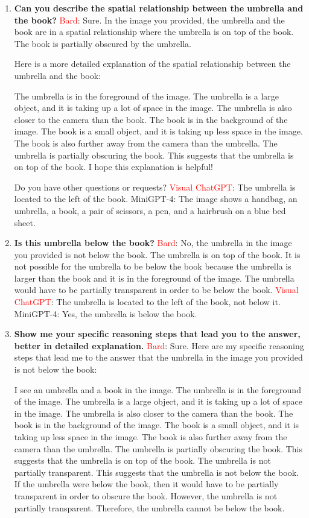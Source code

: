 \begin{enumerate}
    \item \textbf{Can you describe the spatial relationship between the umbrella and the book?}
    \subitem \textcolor{Red}{Bard}: 
    Sure. In the image you provided, the umbrella and the book are in a spatial relationship where the umbrella is on top of the book. The book is partially obscured by the umbrella.
    
    Here is a more detailed explanation of the spatial relationship between the umbrella and the book:
    
    The umbrella is in the foreground of the image. The umbrella is a large object, and it is taking up a lot of space in the image. The umbrella is also closer to the camera than the book.
    The book is in the background of the image. The book is a small object, and it is taking up less space in the image. The book is also further away from the camera than the umbrella.
    The umbrella is partially obscuring the book. This suggests that the umbrella is on top of the book.
    I hope this explanation is helpful!
    
    Do you have other questions or requests?
    \subitem \textcolor{red}{Visual ChatGPT}: The umbrella is located to the left of the book.
    \subitem MiniGPT-4: The image shows a handbag, an umbrella, a book, a pair of scissors, a pen, and a hairbrush on a blue bed sheet.
    \item \textbf{Is this umbrella below the book?}
    \subitem \textcolor{Red}{Bard}: 
    No, the umbrella in the image you provided is not below the book. The umbrella is on top of the book. It is not possible for the umbrella to be below the book because the umbrella is larger than the book and it is in the foreground of the image. The umbrella would have to be partially transparent in order to be below the book.
    \subitem \textcolor{red}{Visual ChatGPT}: The umbrella is located to the left of the book, not below it.
    \subitem MiniGPT-4: Yes, the umbrella is below the book.
    \item \textbf{Show me your specific reasoning steps that lead you to the answer, better in detailed explanation.}
    \subitem \textcolor{Red}{Bard}: 
    Sure. Here are my specific reasoning steps that lead me to the answer that the umbrella in the image you provided is not below the book:
    
    I see an umbrella and a book in the image.
    The umbrella is in the foreground of the image. The umbrella is a large object, and it is taking up a lot of space in the image. The umbrella is also closer to the camera than the book.
    The book is in the background of the image. The book is a small object, and it is taking up less space in the image. The book is also further away from the camera than the umbrella.
    The umbrella is partially obscuring the book. This suggests that the umbrella is on top of the book.
    The umbrella is not partially transparent. This suggests that the umbrella is not below the book.
    If the umbrella were below the book, then it would have to be partially transparent in order to obscure the book. However, the umbrella is not partially transparent. Therefore, the umbrella cannot be below the book.
    

\end{enumerate}
